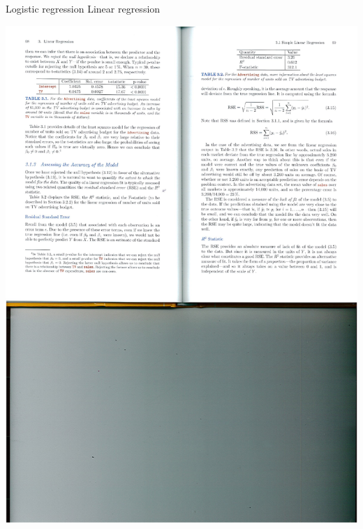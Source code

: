 \documentclass[14pt]{beamer}
\begin{document}
\begin{frame}{Logistic regression}
Linear regression
\centerline{\includegraphics[width=.7\textwidth]{Table8}} 


\end{frame}
\end{document}
